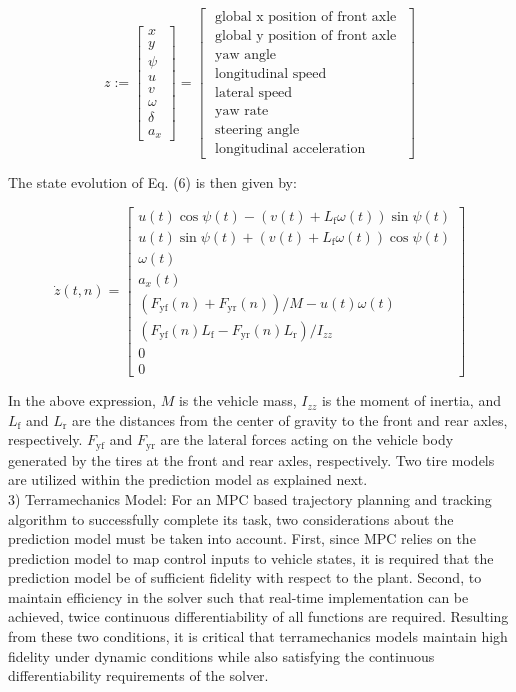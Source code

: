 \documentclass[10pt]{article}
\begin{document}
\[
z:=\left[\begin{array}{c}
x  \tag{12}\\
y \\
\psi \\
u \\
v \\
\omega \\
\delta \\
a_{x}
\end{array}\right]=\left[\begin{array}{c}
\text { global } \mathrm{x} \text { position of front axle } \\
\text { global y position of front axle } \\
\text { yaw angle } \\
\text { longitudinal speed } \\
\text { lateral speed } \\
\text { yaw rate } \\
\text { steering angle } \\
\text { longitudinal acceleration }
\end{array}\right]
\]

The state evolution of Eq. (6) is then given by:

\[
\dot{z}(t, n)=\left[\begin{array}{c}
u(t) \cos \psi(t)-\left(v(t)+L_{\mathrm{f}} \omega(t)\right) \sin \psi(t)  \tag{13}\\
u(t) \sin \psi(t)+\left(v(t)+L_{\mathrm{f}} \omega(t)\right) \cos \psi(t) \\
\omega(t) \\
a_{x}(t) \\
\left(F_{\mathrm{yf}}(n)+F_{\mathrm{yr}}(n)\right) / M-u(t) \omega(t) \\
\left(F_{\mathrm{yf}}(n) L_{\mathrm{f}}-F_{\mathrm{yr}}(n) L_{\mathrm{r}}\right) / I_{z z} \\
0 \\
0
\end{array}\right]
\]

In the above expression, $M$ is the vehicle mass, $I_{z z}$ is the moment of inertia, and $L_{\mathrm{f}}$ and $L_{\mathrm{r}}$ are the distances from the center of gravity to the front and rear axles, respectively. $F_{\mathrm{yf}}$ and $F_{\mathrm{yr}}$ are the lateral forces acting on the vehicle body generated by the tires at the front and rear axles, respectively. Two tire models are utilized within the prediction model as explained next.\\
3) Terramechanics Model: For an MPC based trajectory planning and tracking algorithm to successfully complete its task, two considerations about the prediction model must be taken into account. First, since MPC relies on the prediction model to map control inputs to vehicle states, it is required that the prediction model be of sufficient fidelity with respect to the plant. Second, to maintain efficiency in the solver such that real-time implementation can be achieved, twice continuous differentiability of all functions are required. Resulting from these two conditions, it is critical that terramechanics models maintain high fidelity under dynamic conditions while also satisfying the continuous differentiability requirements of the solver.
\end{document}
